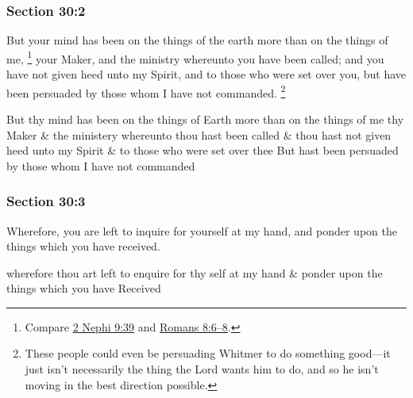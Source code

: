 	\subsubsection{Section 30:2} %
		\label{DC30-2}

		But your mind has been on the things of the earth more than on the things of me,%
			\footnote{%
				Compare \hyperref[2NEPHI-9-39]{2 Nephi 9:39} and \hyperref[ROMANS-8-6]{Romans 8:6--8}.
				}
		your Maker, and the ministry whereunto you have been called; and you have not given heed unto my Spirit, and to those who were set over you, but have been persuaded by those whom I have not commanded.%
			\footnote{%
				These people could even be persuading Whitmer to do something good---it just isn't necessarily the thing the Lord wants him to do, and so he isn't moving in the best direction possible.
				}

		\begin{framed}
		\scriptsize
			\begin{compactdesc}
				\item[JSP] But thy mind has been on the things of Earth more than on the things of me thy Maker \& the ministery whereunto thou hast been called \& thou hast not given heed unto my Spirit \& to those who were set over thee But hast been persuaded by those whom I have not commanded
			\end{compactdesc}
		\end{framed}

	\subsubsection{Section 30:3} %
		\label{DC30-3}

		Wherefore, you are left to inquire for yourself at my hand, and ponder upon the things which you have received.

		\begin{framed}
		\scriptsize
			\begin{compactdesc}
				\item[JSP] wherefore thou art left to enquire for thy self at my hand \& ponder upon the things which you have Received
			\end{compactdesc}
		\end{framed}

